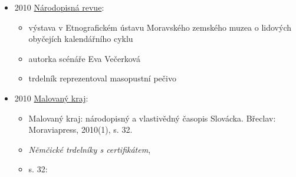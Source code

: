 \begin{itemize}
  \begin{itemize}
  \tightlist
  \item
    není online, 
  \item
    s. 17: moravsko-slovenském pomezí bývaly trdelníky, které dnes
    můžete ochutnat spíše už jen u stánkařů na poutích. Dobré, jemné
  \item
    s. 18: válečkem stále otáčíme a mažeme máslem, až jsou trdelníky
    dozlatova pečené. Hotový trdelník zbývalo sejmout z válečku posypat
  \item
    asi recept podle M. Úlehlové-Tilschové
  \end{itemize}
\item
  2010
  \href{https://www.digitalniknihovna.cz/mzk/uuid/uuid:924ec240-3c30-11e5-8851-005056827e51}{Národopisná
  revue}:

  \begin{itemize}
  \tightlist
  \item
    výstava v Etnografickém ústavu Moravského zemského muzea o lidových
    obyčejích kalendářního cyklu
  \item
    autorka scénáře Eva Večerková
  \item
    trdelník reprezentoval masopustní pečivo
  \end{itemize}
\item
  2010
  \href{https://ndk.cz/uuid/uuid:db238fb1-efa5-11e3-a012-005056825209}{Malovaný
  kraj}:

  \begin{itemize}
  \tightlist
  \item
    Malovaný kraj: národopisný a vlastivědný časopis Slovácka. Břeclav:
    Moraviapress, 2010(1), s. 32.
  \item
    \emph{Němčické trdelníky s certifikátem},
  \item
    s. 32:


\end{itemize}
\end{itemize}
